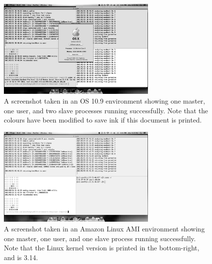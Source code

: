 \documentclass[pdftex,12pt,a4paper]{article}
\begin{document}
\begin{figure}[h]
\begin{center}
\includegraphics[width=0.7\textwidth]{img/osx}
\caption{A screenshot taken in an OS 10.9 environment showing one master, one user, and two slave processes running successfully. Note that the colours have been modified to save ink if this document is printed.}
\label{fig:osx}
\end{center}
\end{figure}

\begin{figure}[h]
\begin{center}
\includegraphics[width=0.7\textwidth]{img/linux}
\caption{A screenshot taken in an Amazon Linux AMI environment showing one master, one user, and one slave process running successfully. Note that the Linux kernel version is printed in the bottom-right, and is 3.14.}
\label{fig:linux}
\end{center}
\end{figure}
\end{document}
